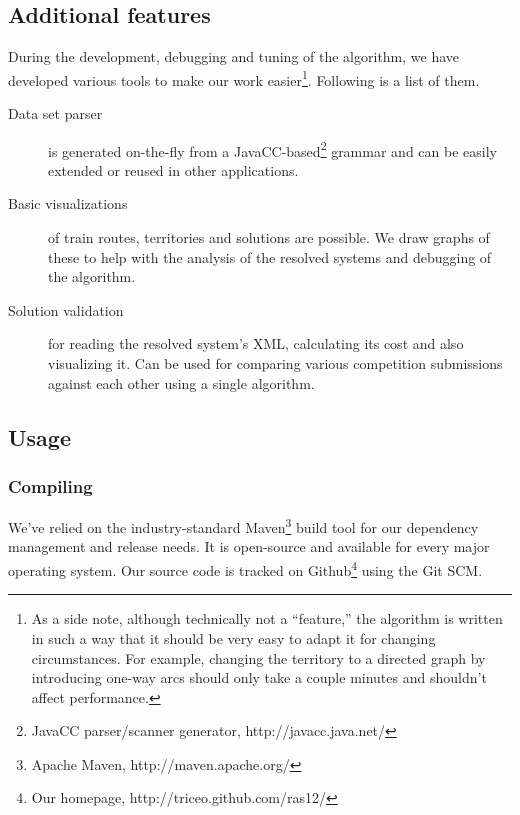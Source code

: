 \documentclass[10pt,a4paper,final]{article}
\begin{document}
\subsection{Additional features} 

During the development, debugging and tuning of the algorithm, we have developed various tools to make our work easier\footnote{As a side note, although technically not a ``feature,'' the algorithm is written in such a way that it should be very easy to adapt it for changing circumstances. For example, changing the territory to a directed graph by introducing one-way arcs should only take a couple minutes and shouldn't affect performance.}. Following is a list of them.

\begin{description}

\item[Data set parser] is generated on-the-fly from a JavaCC-based\footnote{JavaCC parser/scanner generator, http://javacc.java.net/} grammar and can be easily extended or reused in other applications.

\item[Basic visualizations] of train routes, territories and solutions are possible. We draw graphs of these to help with the analysis of the resolved systems and debugging of the algorithm.

\item[Solution validation] for reading the resolved system's XML, calculating its cost and also visualizing it. Can be used for comparing various competition submissions against each other using a single algorithm.

\end{description}


\subsection{Usage}

\subsubsection{Compiling}

We've relied on the industry-standard Maven\footnote{Apache Maven, http://maven.apache.org/} build tool for our dependency management and release needs. It is open-source and available for every major operating system. Our source code is tracked on Github\footnote{Our homepage, http://triceo.github.com/ras12/} using the Git SCM.
\end{document}
